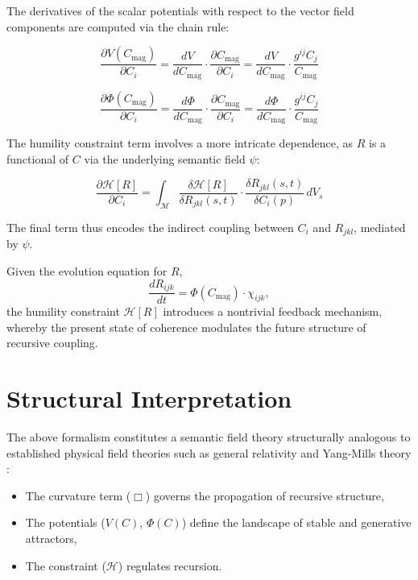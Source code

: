 The derivatives of the scalar potentials with respect to the vector field components are computed via the chain rule:

\begin{equation}
\frac{\partial V(C_{\mathrm{mag}})}{\partial C_i} = \frac{dV}{dC_{\mathrm{mag}}} \cdot \frac{\partial C_{\mathrm{mag}}}{\partial C_i} = \frac{dV}{dC_{\mathrm{mag}}} \cdot \frac{g^{ij} C_j}{C_{\mathrm{mag}}}
\end{equation}

\begin{equation}
\frac{\partial \Phi(C_{\mathrm{mag}})}{\partial C_i} = \frac{d\Phi}{dC_{\mathrm{mag}}} \cdot \frac{\partial C_{\mathrm{mag}}}{\partial C_i} = \frac{d\Phi}{dC_{\mathrm{mag}}} \cdot \frac{g^{ij} C_j}{C_{\mathrm{mag}}}
\end{equation}

The humility constraint term involves a more intricate dependence, as \(R\) is a functional of \(C\) via the underlying semantic field \(\psi\):

\begin{equation}
\frac{\partial \mathcal{H}[R]}{\partial C_i} = \int_{\mathcal{M}} \frac{\delta \mathcal{H}[R]}{\delta R_{jkl}(s, t)} \cdot \frac{\delta R_{jkl}(s, t)}{\delta C_i(p)} \, dV_s
\end{equation}

The final term thus encodes the indirect coupling between \(C_i\) and \(R_{jkl}\), mediated by \(\psi\).

Given the evolution equation for \(R\),
\begin{equation}
\frac{dR_{ijk}}{dt} = \Phi(C_{\mathrm{mag}}) \cdot \chi_{ijk},
\end{equation}
the humility constraint \(\mathcal{H}[R]\) introduces a nontrivial feedback mechanism, whereby the present state of coherence modulates the future structure of recursive coupling.

\section{Structural Interpretation}

The above formalism constitutes a semantic field theory structurally analogous to established physical field theories such as general relativity \autocite{Einstein1915, Wald1984} and Yang-Mills theory \autocite{PeskinSchroeder1995}:

\begin{itemize}
    \item The curvature term (\(\Box\)) governs the propagation of recursive structure,
    \item The potentials (\(V(C)\), \(\Phi(C)\)) define the landscape of stable and generative attractors,
    \item The constraint (\(\mathcal{H}\)) regulates recursion.
\end{itemize}

